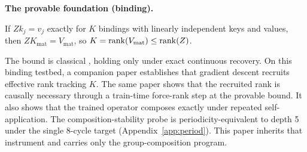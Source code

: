 \textbf{The provable foundation (binding).}
\begin{fact}
\label{fact:bound}
If $Z k_j = v_j$ exactly for $K$ bindings with linearly independent keys
and values, then $Z K_{\mathrm{mat}} = V_{\mathrm{mat}}$, so
$K = \operatorname{rank}(V_{\mathrm{mat}}) \leq \operatorname{rank}(Z)$.
\end{fact}

The bound is classical \citep{kohonen1972correlation,
anderson1972simple}, holding only under exact continuous recovery. On this
binding testbed, a companion paper \citep{larson2026companion} establishes
that gradient descent recruits effective rank tracking $K$. The same paper
shows that the recruited rank is causally necessary through a train-time
force-rank step at the provable bound. It also shows that the trained operator
composes exactly under repeated self-application. The composition-stability
probe is periodicity-equivalent to depth 5 under the single 8-cycle target
\citep{liu2023shortcuts} (Appendix~\ref{app:period}). This paper inherits that
instrument and carries only the group-composition program.
